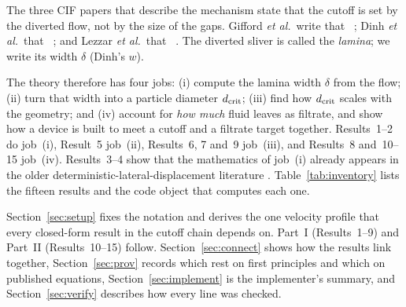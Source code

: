 The three CIF papers that describe the mechanism state that the cutoff is set by the
diverted flow, not by the size of the gaps. Gifford \emph{et al.}\ write that
~\cite[p.~4503]{b1};
Dinh \emph{et al.}\ that
~\cite[p.~915]{b5};
and Lezzar \emph{et al.}\ that
~\cite[p.~9]{b4}.
The diverted sliver is called the \emph{lamina}; we write its width $\delta$ (Dinh's $w$).

The theory therefore has four jobs: (i) compute the lamina width $\delta$ from the flow;
(ii) turn that width into a particle diameter $d_{\mathrm{crit}}$; (iii) find how $d_{\mathrm{crit}}$ scales with
the geometry; and (iv) account for \emph{how much} fluid leaves as filtrate, and show how a
device is built to meet a cutoff and a filtrate target together. Results~1--2 do job~(i),
Result~5 job~(ii), Results~6, 7 and~9 job~(iii), and Results~8 and~10--15 job~(iv).
Results~3--4 show that the mathematics of job~(i) already appears in the older
deterministic-lateral-displacement literature \cite{b17,bdavis06}. Table~\ref{tab:inventory}
lists the fifteen results and the code object that computes each one.

Section~\ref{sec:setup} fixes the notation and derives the one velocity profile that every
closed-form result in the cutoff chain depends on. Part~I (Results~1--9) and Part~II
(Results~10--15) follow. Section~\ref{sec:connect} shows how the results link together,
Section~\ref{sec:prov} records which rest on first principles and which on published
equations, Section~\ref{sec:implement} is the implementer's summary, and
Section~\ref{sec:verify} describes how every line was checked.

